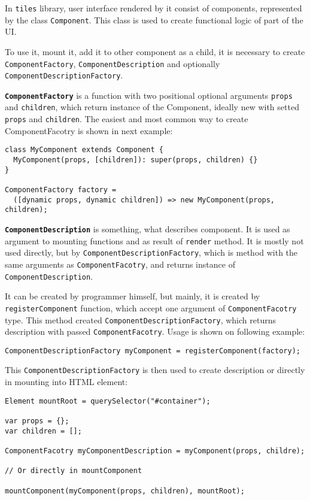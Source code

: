 \documentclass[oneside, 12pt]{book}
\begin{document}
  In \texttt{tiles} library, user interface rendered by it consist of components, represented by the class \texttt{Component}. 
  This class is used to create functional logic of part of the UI. 

  To use it, mount it, add it to other component as a child, it is necessary to create \texttt{ComponentFactory}, 
  \texttt{ComponentDescription} and optionally \texttt{ComponentDescriptionFactory}.

  \textbf{\texttt{ComponentFactory}} is a function with two positional optional arguments \texttt{props} and \texttt{children}, 
  which return instance of the Component, ideally new with setted \texttt{props} and \texttt{children}.
  The easiest and most common way to create ComponentFacotry is shown in next example:
\begin{verbatim}
class MyComponent extends Component {
  MyComponent(props, [children]): super(props, children) {}
}

ComponentFactory factory = 
  ([dynamic props, dynamic children]) => new MyComponent(props, children);
\end{verbatim}



  \textbf{\texttt{ComponentDescription}} is something, what describes component. 
  It is used as argument to mounting functions and as result of \texttt{render} method.
  It is mostly not used directly, but by \texttt{ComponentDescriptionFactory}, 
  which is method with the same arguments as \texttt{ComponentFacotry}, and returns instance of \texttt{ComponentDescription}.

  It can be created by programmer himself, but mainly, it is created by \texttt{registerComponent} function, which accept one argument of \texttt{ComponentFacotry} type.
  This method created \texttt{ComponentDescriptionFactory}, which returns description with passed \texttt{ComponentFacotry}.
  Usage is shown on following example:
\begin{verbatim}
ComponentDescriptionFactory myComponent = registerComponent(factory);
\end{verbatim}



  This \texttt{ComponentDescriptionFactory} is then used to create description or directly in mounting into HTML element:
\begin{verbatim}
Element mountRoot = querySelector("#container");

var props = {};
var children = [];

ComponentFacotry myComponentDescription = myComponent(props, childre);

// Or directly in mountComponent

mountComponent(myComponent(props, children), mountRoot);
\end{verbatim}
\end{document}

